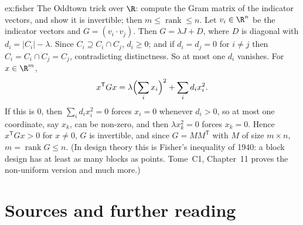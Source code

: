 \begin{solution}{ex:fisher}
\idea The Oddtown trick over $\R$: compute the Gram matrix of the indicator vectors, and show it is invertible; then
$m\le\operatorname{rank}\le n$.
\writeup Let $v_i\in\R^n$ be the indicator vectors and $G=(v_i\cdot v_j)$. Then $G=\lambda J+D$, where $D$ is diagonal with
$d_i=|C_i|-\lambda$. Since $C_i\supseteq C_i\cap C_j$, $d_i\ge0$; and if $d_i=d_j=0$ for $i\ne j$ then $C_i=C_i\cap C_j=C_j$,
contradicting distinctness. So at most one $d_i$ vanishes. For $x\in\R^m$,
\[
x^{\mathsf T}Gx=\lambda\Bigl(\sum_ix_i\Bigr)^2+\sum_id_ix_i^2 .
\]
If this is $0$, then $\sum_id_ix_i^2=0$ forces $x_i=0$ whenever $d_i>0$, so at most one coordinate, say $x_k$, can be
non-zero, and then $\lambda x_k^2=0$ forces $x_k=0$. Hence $x^{\mathsf T}Gx>0$ for $x\ne0$, $G$ is invertible, and since
$G=MM^{\mathsf T}$ with $M$ of size $m\times n$, $m=\operatorname{rank}G\le n$. (In design theory this is Fisher's inequality of 1940:
a block design has at least as many blocks as points. Tome~C1, Chapter~11 proves the non-uniform version and much more.)
\end{solution}

\section*{Sources and further reading}


